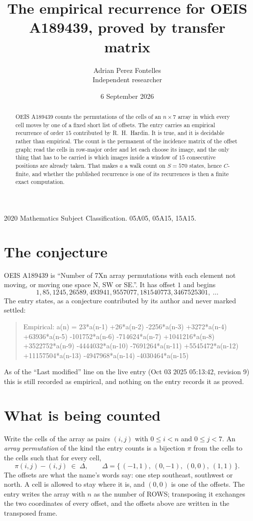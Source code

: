 \documentclass[11pt,a4paper]{article}
\title{The empirical recurrence for OEIS A189439, proved by transfer matrix}
\author{Adrian Perez Fontelles\\ \small Independent researcher}
\date{6 September 2026}
\theoremstyle{plain}
\theoremstyle{definition}
\begin{document}
\maketitle

\begin{abstract}
OEIS A189439 counts the permutations of the cells of an $n\times7$ array in which every cell
moves by one of a fixed short list of offsets. The entry carries an empirical recurrence of
order $15$ contributed by R.~H.~Hardin. It is true, and it is decidable rather than
empirical. The count is the permanent of the incidence matrix of the offset graph; read the
cells in row-major order and let each choose its image, and the only thing that has to be
carried is which images inside a window of $15$ consecutive positions are already taken.
That makes $a$ a walk count on $S=570$ states, hence $C$-finite, and whether the published
recurrence is one of its recurrences is then a finite exact computation.
\end{abstract}

\noindent\small 2020 Mathematics Subject Classification. 05A05, 05A15, 15A15.\normalsize

\section{The conjecture}

OEIS A189439 is ``Number of 7Xn array permutations with each element not moving, or moving one space N, SW or SE.''. It has offset $1$ and begins
\[
1, 85, 1245, 26589, 493941, 9557077, 181540773, 3467525301,\ \dots
\]
The entry states, as a conjecture contributed by its author and never marked settled:
\begin{quote}
Empirical: a(n) = 23*a(n-1) +26*a(n-2) -2256*a(n-3) +3272*a(n-4) +63936*a(n-5) -101752*a(n-6) -714624*a(n-7) +1041216*a(n-8) +3522752*a(n-9) -4444032*a(n-10) -7691264*a(n-11) +5545472*a(n-12) +11157504*a(n-13) -4947968*a(n-14) -4030464*a(n-15)
\end{quote}
As of the ``Last modified'' line on the live entry (Oct 03 2025 05:13:42, revision 9) this is still
recorded as empirical, and nothing on the entry records it as proved.

\section{What is being counted}

Write the cells of the array as pairs $(i,j)$ with $0\le i<n$ and $0\le j<7$. An
\emph{array permutation} of the kind the entry counts is a bijection $\pi$ from the cells to
the cells such that for every cell,
\[
\pi(i,j)-(i,j)\;\in\;\Delta,\qquad
\Delta=\{\,(-1,1),\ (0,-1),\ (0,0),\ (1,1)\,\}.
\]
The offsets are what the name's words say: one step southeast, southwest or north. A cell is allowed to stay where it is, and $(0,0)$ is one of the offsets. The entry writes the array with $n$ as the number of ROWS; transposing it exchanges the two coordinates of every offset, and the offsets above are written in the transposed frame.
\end{document}
